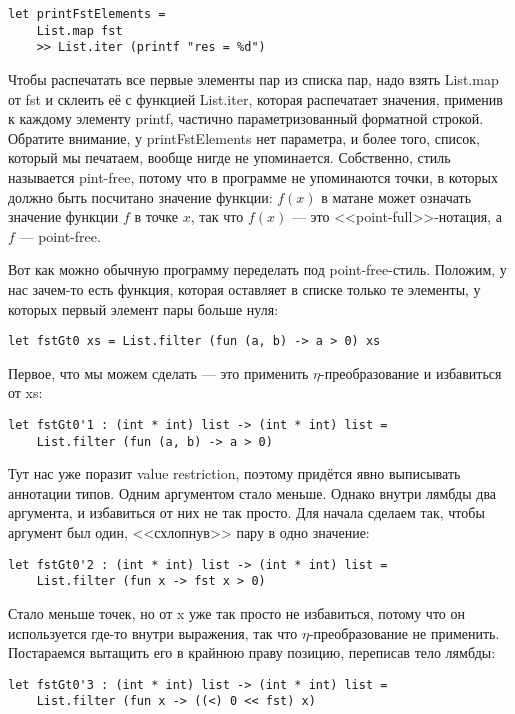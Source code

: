 \documentclass{../../text-style}
\begin{document}
\begin{verbatim}
let printFstElements = 
    List.map fst
    >> List.iter (printf "res = %d")
\end{verbatim}

Чтобы распечатать все первые элементы пар из списка пар, надо взять List.map от fst и склеить её с функцией List.iter, которая распечатает значения, применив к каждому элементу printf, частично параметризованный форматной строкой. Обратите внимание, у printFstElements нет параметра, и более того, список, который мы печатаем, вообще нигде не упоминается. Собственно, стиль называется pint-free, потому что в программе не упоминаются точки, в которых должно быть посчитано значение функции: $f(x)$ в матане может означать значение функции $f$ в точке $x$, так что $f(x)$ --- это <<point-full>>-нотация, а $f$ --- point-free.

Вот как можно обычную программу переделать под point-free-стиль. Положим, у нас зачем-то есть функция, которая оставляет в списке только те элементы, у которых первый элемент пары больше нуля:

\begin{verbatim}
let fstGt0 xs = List.filter (fun (a, b) -> a > 0) xs
\end{verbatim}

Первое, что мы можем сделать --- это применить $\eta$-преобразование и избавиться от xs:

\begin{verbatim}
let fstGt0'1 : (int * int) list -> (int * int) list = 
    List.filter (fun (a, b) -> a > 0)
\end{verbatim}

Тут нас уже поразит value restriction, поэтому придётся явно выписывать аннотации типов. Одним аргументом стало меньше. Однако внутри лямбды два аргумента, и избавиться от них не так просто. Для начала сделаем так, чтобы аргумент был один, <<схлопнув>> пару в одно значение:

\begin{verbatim}
let fstGt0'2 : (int * int) list -> (int * int) list = 
    List.filter (fun x -> fst x > 0)
\end{verbatim}

Стало меньше точек, но от x уже так просто не избавиться, потому что он используется где-то внутри выражения, так что $\eta$-преобразование не применить. Постараемся вытащить его в крайнюю праву позицию, переписав тело лямбды:

\begin{verbatim}
let fstGt0'3 : (int * int) list -> (int * int) list = 
    List.filter (fun x -> ((<) 0 << fst) x)
\end{verbatim}
\end{document}
